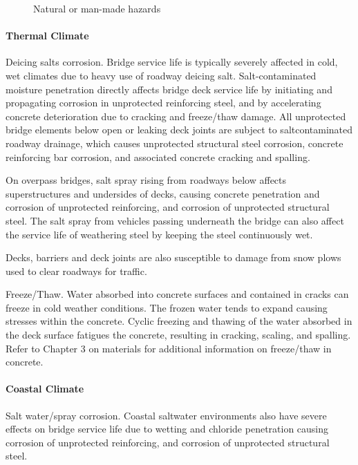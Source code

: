 \begin{figure}
  \caption{Natural or man-made hazards}\label{fig:natural-man-made-hazards}
\end{figure}

\paragraph{Thermal Climate}
Deicing salts corrosion. Bridge service life is typically severely affected in cold, wet climates due to heavy use
of roadway deicing salt. Salt-contaminated moisture penetration directly affects bridge deck service life by initiating and propagating corrosion in unprotected reinforcing steel, and by accelerating concrete deterioration due to cracking
and freeze/thaw damage. All unprotected bridge elements below open or leaking deck joints are subject to saltcontaminated
roadway drainage, which causes unprotected structural steel corrosion, concrete reinforcing bar
corrosion, and associated concrete cracking and spalling.

On overpass bridges, salt spray rising from roadways below affects superstructures and undersides of decks,
causing concrete penetration and corrosion of unprotected reinforcing, and corrosion of unprotected structural steel.
The salt spray from vehicles passing underneath the bridge can also affect the service life of weathering steel by
keeping the steel continuously wet.

Decks, barriers and deck joints are also susceptible to damage from snow plows used to clear roadways for
traffic.

Freeze/Thaw. Water absorbed into concrete surfaces and contained in cracks can freeze in cold weather
conditions. The frozen water tends to expand causing stresses within the concrete. Cyclic freezing and thawing of the
water absorbed in the deck surface fatigues the concrete, resulting in cracking, scaling, and spalling. Refer to
Chapter 3 on materials for additional information on freeze/thaw in concrete.

\paragraph{Coastal Climate}
Salt water/spray corrosion. Coastal saltwater environments also have severe effects on bridge service life due
to wetting and chloride penetration causing corrosion of unprotected reinforcing, and corrosion of unprotected
structural steel.

